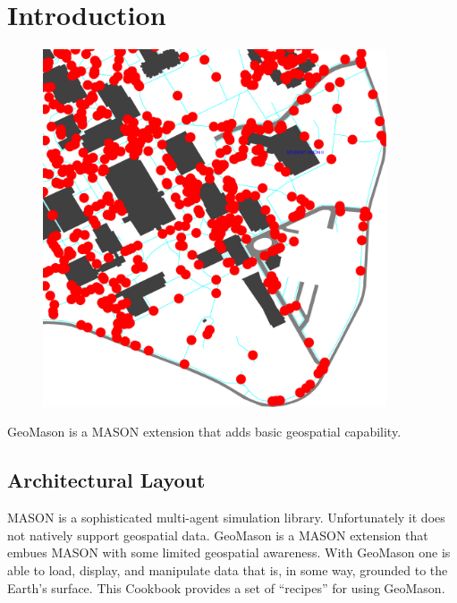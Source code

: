 \documentclass[twoside,10pt]{book}
\begin{document}
\normalsize
\cleardoublepage

\tableofcontents
\clearpage


\chapter{Introduction}
\label{ch:intro}

\begin{figure}[h]\vspace{-33em}\hspace{30em}\includegraphics[width=4in]{campus.pdf}\vspace{2em}\end{figure}

GeoMason is a MASON extension that adds basic geospatial capability.

\section{Architectural Layout}



MASON is a sophisticated multi-agent simulation library.
Unfortunately it does not natively support geospatial data.  GeoMason
is a MASON extension that embues MASON with some limited geospatial
awareness.  With GeoMason one is able to load, display, and manipulate
data that is, in some way, grounded to the Earth's surface.  This
Cookbook provides a set of ``recipes'' for using GeoMason.
\end{document}
